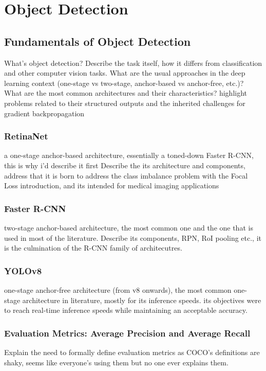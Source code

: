 \chapter{Object Detection}
\label{ch:object-detection}
\section{Fundamentals of Object Detection}
What's object detection? Describe the task itself, how it differs from  classification and other computer vision tasks. What are the usual approaches in the deep learning context (one-stage vs two-stage, anchor-based vs anchor-free, etc.)? What are the most common architectures and their characteristics? 
highlight problems related to their structured outputs and the inherited challenges for gradient backpropagation 

\subsection{RetinaNet}
a one-stage anchor-based architecture, essentially a toned-down Faster R-CNN, this is why i'd describe it first
Describe the its architecture and components, address that it is born to address the class imbalance problem with the Focal Loss introduction, and its intended for medical imaging applications

\subsection{Faster R-CNN}
two-stage anchor-based architecture, the most common one and the one that is used in most of the literature.
Describe its components, RPN, RoI pooling etc., it is the culmination of the R-CNN family of architecutres.

\subsection{YOLOv8}
one-stage anchor-free architecture (from v8 onwards), the most common one-stage architecture in literature, mostly for its inference speeds. its objectives were to reach real-time inference speeds while maintaining an acceptable accuracy.

\subsection{Evaluation Metrics: Average Precision and Average Recall}
Explain the need to formally define evaluation metrics as COCO's definitions are shaky, seems like everyone's using them but no one ever explains them.

